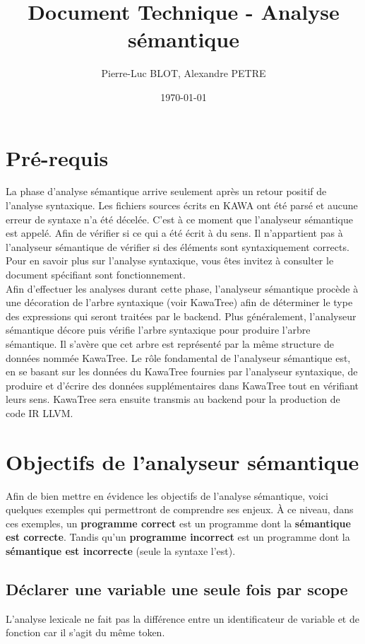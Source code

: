 \documentclass{../../res/univ-projet}
\title{Document Technique - Analyse sémantique}
\author{Pierre-Luc BLOT, Alexandre PETRE}
\date{\today}
\begin{document}
\maketitle
\newpage
\tableofcontents
\newpage

\section{Pré-requis}
  La phase d'analyse sémantique arrive seulement après un retour positif de l'analyse syntaxique. Les fichiers sources écrits en KAWA ont été parsé et aucune erreur de syntaxe n'a été décelée. C'est à ce moment que l'analyseur sémantique est appelé. Afin de vérifier si ce qui a été écrit à du sens. Il n'appartient pas à l'analyseur sémantique de vérifier si des éléments sont syntaxiquement corrects. Pour en savoir plus sur l'analyse syntaxique, vous êtes invitez à consulter le document spécifiant sont fonctionnement.\\
  Afin d'effectuer les analyses durant cette phase, l'analyseur sémantique procède à une décoration de l'arbre syntaxique (voir KawaTree) afin de déterminer le type des expressions qui seront traitées par le backend. Plus généralement, l'analyseur sémantique décore puis vérifie l'arbre syntaxique pour produire l'arbre sémantique. Il s'avère que cet arbre est représenté par la même structure de données nommée KawaTree. Le rôle fondamental de l'analyseur sémantique est, en se basant sur les données du KawaTree fournies par l'analyseur syntaxique, de produire et d'écrire des données supplémentaires dans KawaTree tout en vérifiant leurs sens. KawaTree sera ensuite transmis au backend pour la production de code IR LLVM.

\section{Objectifs de l'analyseur sémantique}
  Afin de bien mettre en évidence les objectifs de l'analyse sémantique, voici quelques exemples qui permettront de comprendre ses enjeux. À ce niveau, dans ces exemples, un {\bfseries \color{success} programme correct} est un programme dont la {\bfseries \color{success} sémantique est correcte}. Tandis qu'un {\bfseries \color{danger} programme incorrect} est un programme dont la {\bfseries \color{danger} sémantique est incorrecte} (seule la syntaxe l'est).

  
    \subsection{Déclarer une variable une seule fois par scope}
      L'analyse lexicale ne fait pas la différence entre un identificateur de variable et de fonction car il s'agit du même token.\\
\end{document}
